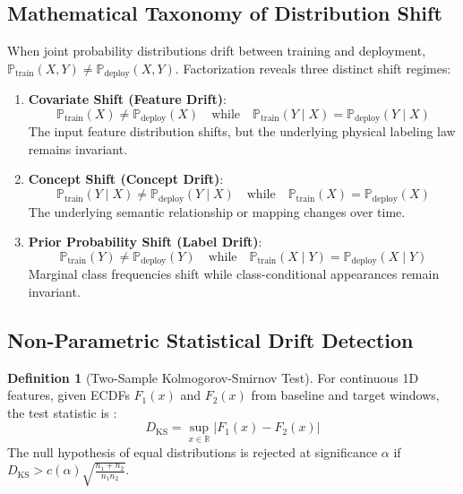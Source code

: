 \documentclass[11pt,a4paper]{article}
\theoremstyle{definition}
\newtheorem{definition}{Definition}[section]
\theoremstyle{plain}
\theoremstyle{remark}
\newcommand{\abs}[1]{\left\lvert#1\right\rvert}
\newcommand{\R}{\mathbb{R}}
\begin{document}
\subsection{Mathematical Taxonomy of Distribution Shift}
When joint probability distributions drift between training and deployment, $\mathbb{P}_{\mathrm{train}}(X, Y) \neq \mathbb{P}_{\mathrm{deploy}}(X, Y)$. Factorization reveals three distinct shift regimes:
\begin{enumerate}
    \item \textbf{Covariate Shift (Feature Drift)}:
    \begin{equation}
    \mathbb{P}_{\mathrm{train}}(X) \neq \mathbb{P}_{\mathrm{deploy}}(X) \quad \text{while} \quad \mathbb{P}_{\mathrm{train}}(Y \mid X) = \mathbb{P}_{\mathrm{deploy}}(Y \mid X)
    \end{equation}
    The input feature distribution shifts, but the underlying physical labeling law remains invariant.
    \item \textbf{Concept Shift (Concept Drift)}:
    \begin{equation}
    \mathbb{P}_{\mathrm{train}}(Y \mid X) \neq \mathbb{P}_{\mathrm{deploy}}(Y \mid X) \quad \text{while} \quad \mathbb{P}_{\mathrm{train}}(X) = \mathbb{P}_{\mathrm{deploy}}(X)
    \end{equation}
    The underlying semantic relationship or mapping changes over time.
    \item \textbf{Prior Probability Shift (Label Drift)}:
    \begin{equation}
    \mathbb{P}_{\mathrm{train}}(Y) \neq \mathbb{P}_{\mathrm{deploy}}(Y) \quad \text{while} \quad \mathbb{P}_{\mathrm{train}}(X \mid Y) = \mathbb{P}_{\mathrm{deploy}}(X \mid Y)
    \end{equation}
    Marginal class frequencies shift while class-conditional appearances remain invariant.
\end{enumerate}

\subsection{Non-Parametric Statistical Drift Detection}
\begin{definition}[Two-Sample Kolmogorov-Smirnov Test]
For continuous 1D features, given ECDFs $F_1(x)$ and $F_2(x)$ from baseline and target windows, the test statistic is \cite{massey1951kolmogorov}:
\begin{equation}
D_{\mathrm{KS}} = \sup_{x \in \R} \abs{F_1(x) - F_2(x)}
\end{equation}
The null hypothesis of equal distributions is rejected at significance $\alpha$ if $D_{\mathrm{KS}} > c(\alpha)\sqrt{\frac{n_1 + n_2}{n_1 n_2}}$.
\end{definition}
\end{document}
